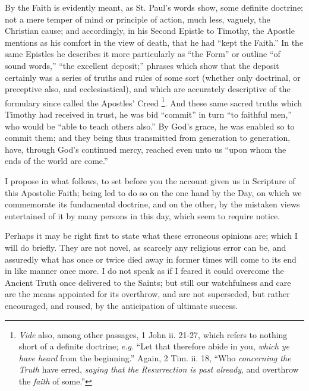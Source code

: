 By the Faith is evidently meant, as St. Paul's words show, some
definite doctrine; not a mere temper of mind or principle of action,
much less, vaguely, the Christian cause; and accordingly, in his Second
Epistle to Timothy, the Apostle mentions as his comfort in the view of
death, that he had ``kept the Faith.'' In the same Epistles he
describes it more particularly as ``the Form'' or outline
``of sound words,'' ``the excellent deposit;'' phrases
which show that the deposit certainly was a series of truths and rules
of some sort (whether only doctrinal, or preceptive also, and
ecclesiastical), and which are accurately descriptive of the formulary
since called the Apostles' Creed \footnote{\emph{Vide} also, among other passages, 1 John
ii. 21-27, which refers to nothing short of a definite doctrine; \emph{e.g}.
``Let that therefore abide in you, \emph{which ye have heard} from
the beginning.'' Again, 2 Tim. ii. 18, ``Who \emph{concerning the
Truth} have erred, \emph{saying that the Resurrection is past already},
and overthrow the \emph{faith} of some.''}.
And these same sacred truths which Timothy had received in trust, he was
bid ``commit'' in turn ``to faithful men,'' who would be
``able to teach others also.'' By God's grace, he was enabled so
to commit them; and they being thus transmitted from generation to
generation, have, through God's continued mercy, reached even unto us
``upon whom the ends of the world are come.''

I propose in what follows, to set before you the account given us in
Scripture of this Apostolic Faith; being led to do so on the one hand by
the Day, on which we commemorate its fundamental doctrine, and on the
other, by the mistaken views entertained of it by many persons in this
day, which seem to require notice.

Perhaps it may be right first to state what these erroneous opinions
are; which I will do briefly. They are not novel, as scarcely any
religious error can be, and assuredly what has once or twice died away
in former times will come to its end in like manner once more. I do not
speak as if I feared it could overcome the Ancient Truth once delivered
to the Saints; but still our watchfulness and care are the means
appointed for its overthrow, and are not superseded, but rather
encouraged, and roused, by the anticipation of ultimate success.

